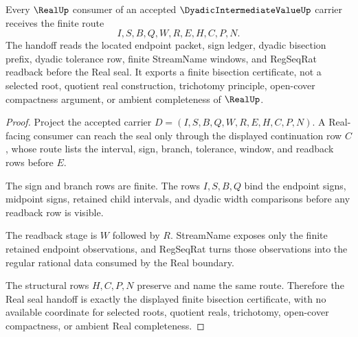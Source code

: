 \begin{theorem}
\label{thm:dyadic-intermediate-value-real-seal-handoff}
Every $\RealUp$ consumer of an accepted $\DyadicIntermediateValueUp$ carrier receives the finite route
$$
I,S,B,Q,W,R,E,H,C,P,N .
$$
The handoff reads the located endpoint packet, sign ledger, dyadic bisection prefix, dyadic tolerance row, finite StreamName windows, and RegSeqRat readback before the Real seal. It exports a finite bisection certificate, not a selected root, quotient real construction, trichotomy principle, open-cover compactness argument, or ambient completeness of $\RealUp$.
\end{theorem}
\begin{proof}
Project the accepted carrier $D=(I,S,B,Q,W,R,E,H,C,P,N)$. A Real-facing consumer can reach the seal only through the displayed continuation row $C$, whose route lists the interval, sign, branch, tolerance, window, and readback rows before $E$.

The sign and branch rows are finite. The rows $I,S,B,Q$ bind the endpoint signs, midpoint signs, retained child intervals, and dyadic width comparisons before any readback row is visible.

The readback stage is $W$ followed by $R$. StreamName exposes only the finite retained endpoint observations, and RegSeqRat turns those observations into the regular rational data consumed by the Real boundary.

The structural rows $H,C,P,N$ preserve and name the same route. Therefore the Real seal handoff is exactly the displayed finite bisection certificate, with no available coordinate for selected roots, quotient reals, trichotomy, open-cover compactness, or ambient Real completeness.
\end{proof}


